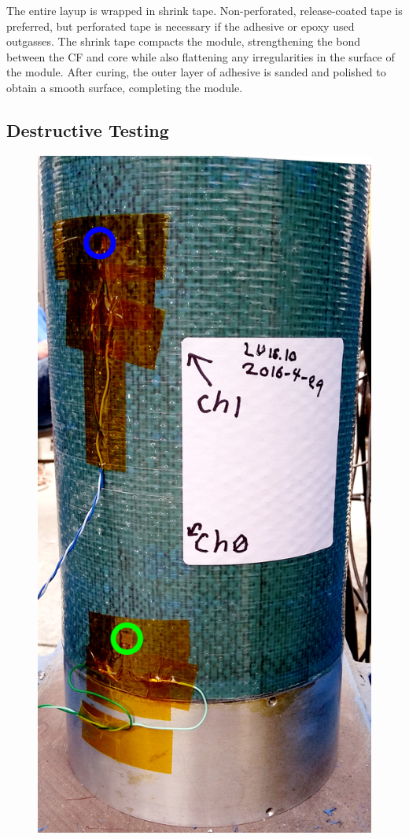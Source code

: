 \documentclass{aiaa-tc}%
\begin{document}
The entire layup is wrapped in shrink tape. Non-perforated, release-coated tape is preferred, but perforated tape is necessary if the adhesive or epoxy used outgasses.
The shrink tape compacts the module, strengthening the bond between the CF and core while also flattening any irregularities in the surface of the module. 
After curing, the outer layer of adhesive is sanded and polished to obtain a smooth surface, completing the module. 

\subsection{Destructive Testing}
\label{sec:testing}

\begin{figure}[t]
	\centering
	\parbox{0.35\linewidth}
	{
		\centering
		\includegraphics[width=\linewidth]{../img/LU16-10crush_close.jpg}
}
\end{figure}
\end{document}
